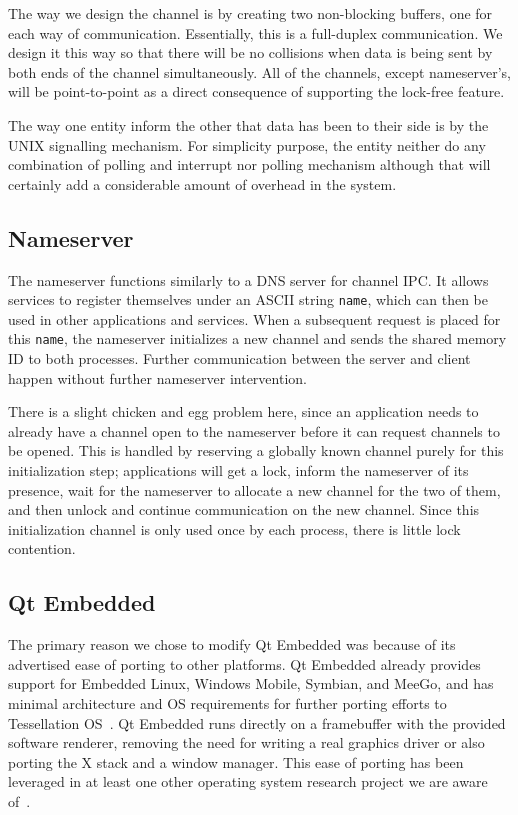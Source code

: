 \documentclass[letterpaper,twocolumn,10pt]{article}
\begin{document}
The way we design the channel is by creating two non-blocking buffers, one for each way of communication. Essentially, this is a full-duplex communication. We design it this way so that there will be no collisions when data is being sent by both ends of the channel simultaneously. All of the channels, except nameserver's, will be point-to-point as a direct consequence of supporting the lock-free feature. 

The way one entity inform the other that data has been to their side is by the UNIX signalling mechanism. For simplicity purpose, the entity neither do any combination of polling and interrupt nor polling mechanism although that will certainly add a considerable amount of overhead in the system.


\subsection{Nameserver}
The nameserver functions similarly to a DNS server for channel IPC. It allows services to register themselves under an ASCII string {\tt name}, which can then be used in other applications and services. When a subsequent request is placed for this {\tt name}, the nameserver initializes a new channel and sends the shared memory ID to both processes. Further communication between the server and client happen without further nameserver intervention.

There is a slight chicken and egg problem here, since an application needs to already have a channel open to the nameserver before it can request channels to be opened. This is handled by reserving a globally known channel purely for this initialization step; applications will get a lock, inform the nameserver of its presence, wait for the nameserver to allocate a new channel for the two of them, and then unlock and continue communication on the new channel. Since this initialization channel is only used once by each process, there is little lock contention.

\subsection{Qt Embedded}

The primary reason we chose to modify Qt Embedded was because of its advertised ease of porting to other platforms. Qt Embedded already provides support for Embedded Linux, Windows Mobile, Symbian, and MeeGo, and has minimal architecture and OS requirements for further porting efforts to Tessellation OS~\cite{qtembedded}.
 Qt Embedded runs directly on a framebuffer with the provided software renderer, removing the need for writing a real graphics driver or also porting the X stack and a window manager. This ease of porting has been leveraged in at least one other operating system research project we are aware of~\cite{ibos}. 
\end{document}
